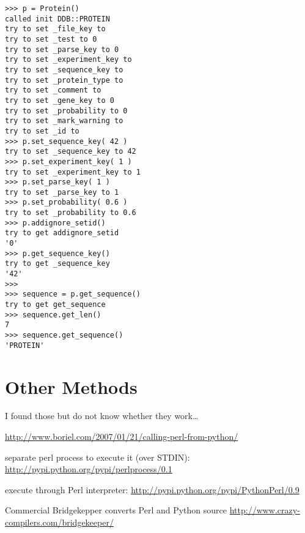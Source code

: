\begin{verbatim}
>>> p = Protein()
called init DDB::PROTEIN
try to set _file_key to
try to set _test to 0
try to set _parse_key to 0
try to set _experiment_key to
try to set _sequence_key to
try to set _protein_type to
try to set _comment to
try to set _gene_key to 0
try to set _probability to 0
try to set _mark_warning to
try to set _id to
>>> p.set_sequence_key( 42 )
try to set _sequence_key to 42
>>> p.set_experiment_key( 1 )
try to set _experiment_key to 1
>>> p.set_parse_key( 1 )
try to set _parse_key to 1
>>> p.set_probability( 0.6 )
try to set _probability to 0.6
>>> p.addignore_setid()
try to get addignore_setid
'0'
>>> p.get_sequence_key()
try to get _sequence_key
'42'
>>>
>>> sequence = p.get_sequence()
try to get get_sequence
>>> sequence.get_len()
7
>>> sequence.get_sequence()
'PROTEIN'
\end{verbatim}


\newpage
\section{Other Methods}
I found those but do not know whether they work\ldots

\url{http://www.boriel.com/2007/01/21/calling-perl-from-python/}

separate perl process to execute it (over STDIN):
\url{http://pypi.python.org/pypi/perlprocess/0.1}

execute through Perl interpreter:
\url{http://pypi.python.org/pypi/PythonPerl/0.9}

Commercial Bridgekepper converts Perl and Python source 
\url{http://www.crazy-compilers.com/bridgekeeper/}

